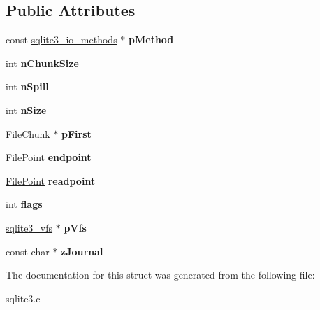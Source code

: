 \subsection*{Public Attributes}
\begin{DoxyCompactItemize}
\item 
const \hyperlink{structsqlite3__io__methods}{sqlite3\+\_\+io\+\_\+methods} $\ast$ {\bfseries p\+Method}\hypertarget{structMemJournal_aad04f16d7faaeb548b3197cce7b0d37f}{}\label{structMemJournal_aad04f16d7faaeb548b3197cce7b0d37f}

\item 
int {\bfseries n\+Chunk\+Size}\hypertarget{structMemJournal_a15ba0375c0a30b355f5f7594e8804c1a}{}\label{structMemJournal_a15ba0375c0a30b355f5f7594e8804c1a}

\item 
int {\bfseries n\+Spill}\hypertarget{structMemJournal_afee076918f23dc1cd05681cb0504a77d}{}\label{structMemJournal_afee076918f23dc1cd05681cb0504a77d}

\item 
int {\bfseries n\+Size}\hypertarget{structMemJournal_a5c3de9e25d0e0a6fb36beec447de0c36}{}\label{structMemJournal_a5c3de9e25d0e0a6fb36beec447de0c36}

\item 
\hyperlink{structFileChunk}{File\+Chunk} $\ast$ {\bfseries p\+First}\hypertarget{structMemJournal_ade7a6dea7b38a8a86f33476ae207765f}{}\label{structMemJournal_ade7a6dea7b38a8a86f33476ae207765f}

\item 
\hyperlink{structFilePoint}{File\+Point} {\bfseries endpoint}\hypertarget{structMemJournal_ac69637f95cfbce175cbeef00f71e59a9}{}\label{structMemJournal_ac69637f95cfbce175cbeef00f71e59a9}

\item 
\hyperlink{structFilePoint}{File\+Point} {\bfseries readpoint}\hypertarget{structMemJournal_a5645d38e1a488b62b5f63112628bf472}{}\label{structMemJournal_a5645d38e1a488b62b5f63112628bf472}

\item 
int {\bfseries flags}\hypertarget{structMemJournal_a1fcfbcbb9da77a5cefef038b1b846f35}{}\label{structMemJournal_a1fcfbcbb9da77a5cefef038b1b846f35}

\item 
\hyperlink{structsqlite3__vfs}{sqlite3\+\_\+vfs} $\ast$ {\bfseries p\+Vfs}\hypertarget{structMemJournal_a5174aefb3d641db787fd1952e6e2fd7d}{}\label{structMemJournal_a5174aefb3d641db787fd1952e6e2fd7d}

\item 
const char $\ast$ {\bfseries z\+Journal}\hypertarget{structMemJournal_a60e0eed44abd876329d1f7d9a4c0d773}{}\label{structMemJournal_a60e0eed44abd876329d1f7d9a4c0d773}

\end{DoxyCompactItemize}


The documentation for this struct was generated from the following file\+:\begin{DoxyCompactItemize}
\item 
sqlite3.\+c\end{DoxyCompactItemize}
